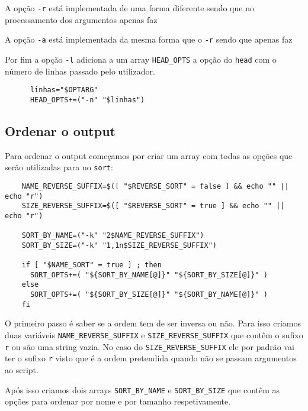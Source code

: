 A opção \Verb|-r| está implementada de uma forma diferente sendo que no processamento dos argumentos apenas faz 

A opção \Verb|-a| está implementada da mesma forma que o \Verb|-r| sendo que apenas faz 

Por fim a opção \Verb|-l| adiciona a um array \Verb|HEAD_OPTS| a opção do \Verb|head| com o número de linhas passado pelo utilizador.

\begin{listing}[H]
	\centering
	\begin{verbatim}
      linhas="$OPTARG"
      HEAD_OPTS+=("-n" "$linhas")
  \end{verbatim}
\end{listing}

\subsection{Ordenar o output}\label{sec:implementation_sort}

Para ordenar o output começamos por criar um array com todas as opções que serão utilizadas para no \Verb|sort|:

\begin{listing}[H]
	\centering
	\begin{verbatim}
    NAME_REVERSE_SUFFIX=$([ "$REVERSE_SORT" = false ] && echo "" || echo "r")
    SIZE_REVERSE_SUFFIX=$([ "$REVERSE_SORT" = true ] && echo "" || echo "r")

    SORT_BY_NAME=("-k" "2$NAME_REVERSE_SUFFIX")
    SORT_BY_SIZE=("-k" "1,1n$SIZE_REVERSE_SUFFIX")

    if [ "$NAME_SORT" = true ] ; then
      SORT_OPTS+=( "${SORT_BY_NAME[@]}" "${SORT_BY_SIZE[@]}" )
    else
      SORT_OPTS+=( "${SORT_BY_SIZE[@]}" "${SORT_BY_NAME[@]}" )
    fi
  \end{verbatim}
\end{listing}

O primeiro passo é saber se a ordem tem de ser inversa ou não.
Para isso criamos duas variáveis \Verb|NAME_REVERSE_SUFFIX| e \Verb|SIZE_REVERSE_SUFFIX| que contêm o sufixo \Verb|r| ou são uma string vazia.
No caso do \Verb|SIZE_REVERSE_SUFFIX| ele por padrão vai ter o sufixo \Verb|r| visto que é a ordem pretendida quando não se passam argumentos ao script.

Após isso criamos dois arrays \Verb|SORT_BY_NAME| e \Verb|SORT_BY_SIZE| que contêm as opções para ordenar por nome e por tamanho respetivamente.

